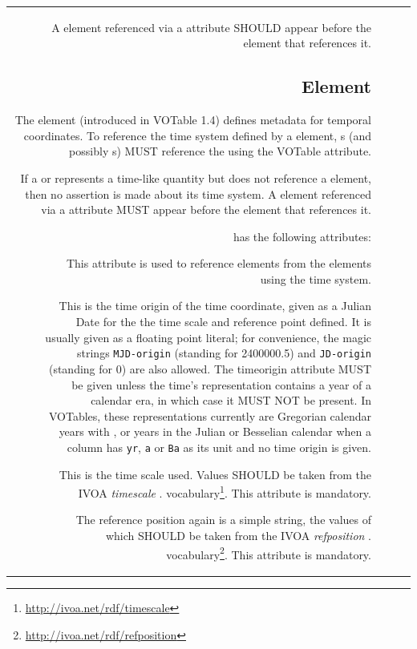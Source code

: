 \begin{tabular}{RRCp{0.8\textwidth}}
\begin{center}
A  element referenced via a  attribute
SHOULD appear before the element that references it.

\subsection{\texorpdfstring{ Element}
	{TIMESYS Element}}
\label{elem:TIMESYS}

The  element (introduced in VOTable 1.4) defines metadata
for temporal coordinates.  To reference the time system defined by a 
 element,  s (and possibly s)
MUST reference the  using the VOTable  attribute.

If a  or  represents a time-like quantity but does not 
reference a  element, then no assertion is made about its time 
system. A  element referenced via a  attribute MUST appear 
before the element that references it.

 has the following attributes:

\begin{description}
\item[] This attribute is used to reference 
elements from the elements using the time system.
\item[] This is the time origin of the time coordinate,
given as a Julian Date for the the time scale and reference point
defined.  It is usually given as a floating point
literal; for convenience, the magic strings \verb|MJD-origin| (standing
for 2400000.5) and \verb|JD-origin| (standing for 0) are also allowed.
The timeorigin attribute MUST be given unless the time's representation
contains a year of a calendar era, in which case it MUST NOT be present.  
In VOTables, these
representations currently are Gregorian calendar years with
, or years in the Julian or Besselian calendar when a column
has \verb|yr|, \verb|a| or \verb|Ba| as its unit and no time origin is 
given. 
\item[]  This is the time scale used.  Values SHOULD be
taken from the IVOA \emph{timescale}
\ifhtx{}.
\else
vocabulary\footnote{\url{http://ivoa.net/rdf/timescale}}.
\fi
This attribute is mandatory.
\item[] The reference position again is a simple string,
the values of which SHOULD be taken from the IVOA \emph{refposition}
\ifhtx{}.
\else
vocabulary\footnote{\url{http://ivoa.net/rdf/refposition}}.
\fi
This attribute is mandatory.
\end{description}


\end{center}
\end{tabular}
